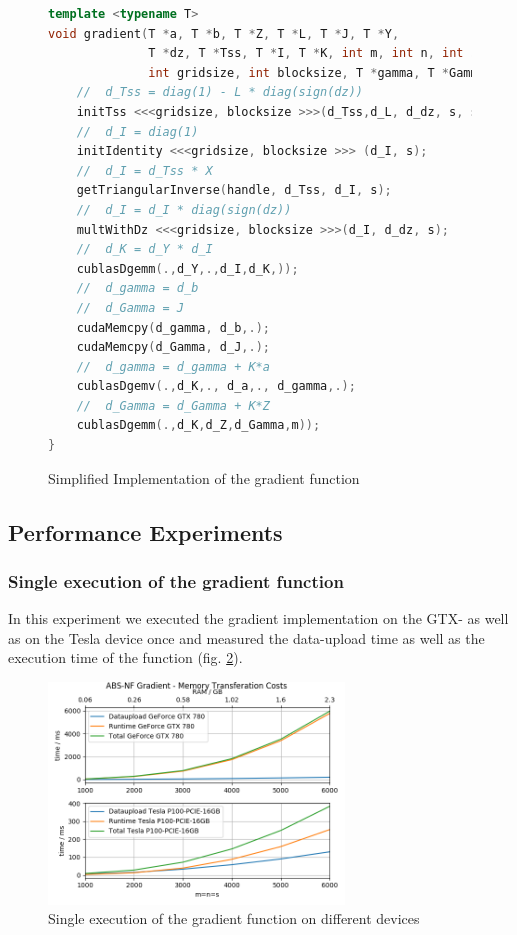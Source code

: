\begin{figure}
\begin{lstlisting}[language=cpp]
template <typename T>
void gradient(T *a, T *b, T *Z, T *L, T *J, T *Y,
			  T *dz, T *Tss, T *I, T *K, int m, int n, int s,
			  int gridsize, int blocksize, T *gamma, T *Gamma)
	//  d_Tss = diag(1) - L * diag(sign(dz))
	initTss <<<gridsize, blocksize >>>(d_Tss,d_L, d_dz, s, s*s);
	//  d_I = diag(1)
	initIdentity <<<gridsize, blocksize >>> (d_I, s);
	//  d_I = d_Tss * X	
	getTriangularInverse(handle, d_Tss, d_I, s);
	//	d_I = d_I * diag(sign(dz))
	multWithDz <<<gridsize, blocksize >>>(d_I, d_dz, s);
	//	d_K = d_Y * d_I
	cublasDgemm(.,d_Y,.,d_I,d_K,));
	//	d_gamma = d_b
	//  d_Gamma = J
	cudaMemcpy(d_gamma, d_b,.);
	cudaMemcpy(d_Gamma, d_J,.);
	//	d_gamma = d_gamma + K*a
	cublasDgemv(.,d_K,., d_a,., d_gamma,.);
	//  d_Gamma = d_Gamma + K*Z
	cublasDgemm(.,d_K,d_Z,d_Gamma,m));
}
\end{lstlisting}
\caption{Simplified Implementation of the gradient function \label{fig_lst_grad}}
\end{figure}

\subsection{Performance Experiments}
\subsubsection{Single execution of the gradient function}
In this experiment we executed the gradient implementation on the GTX- as well as on the Tesla device once and measured the data-upload time as well as the execution time of the function (fig. \ref{fig_grad_memory}).
\begin{figure}[ht]
	\centering
	\includegraphics[width=0.7\textwidth]{img/gradient_memory.png}
	\caption{Single execution of the gradient function on different devices}
	\label{fig_grad_memory}
\end{figure}
